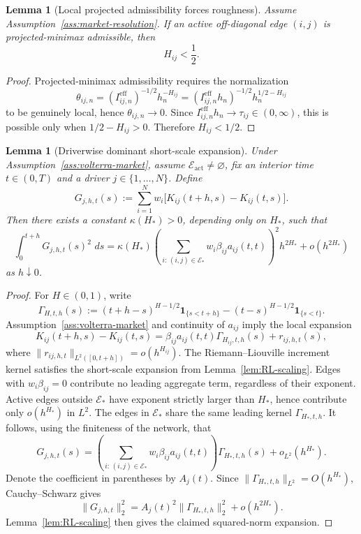 \documentclass[11pt,a4paper]{amsart}
\theoremstyle{plain}
\newtheorem{lemma}[theorem]{Lemma}
\theoremstyle{definition}
\theoremstyle{remark}
\newcommand{\one}{\mathbf{1}}
\newcommand{\dd}{\,d}
\newcommand{\cE}{\mathcal{E}}
\begin{document}
\begin{lemma}[Local projected admissibility forces roughness]\label{lem:admissibility-rough}
Assume Assumption~\ref{ass:market-resolution}.  If an active off-diagonal edge \((i,j)\) is
projected-minimax admissible, then
\[
        H_{ij}<\frac12.
\]
\end{lemma}

\begin{proof}
Projected-minimax admissibility requires the normalization
\[
        \theta_{ij,n}
        =
        (I_{ij,n}^{\mathrm{eff}})^{-1/2}h_n^{-H_{ij}}
        =
        (I_{ij,n}^{\mathrm{eff}} h_n)^{-1/2}h_n^{1/2-H_{ij}}
\]
to be genuinely local, hence \(\theta_{ij,n}\to0\).  Since
\(I_{ij,n}^{\mathrm{eff}}h_n\to\tau_{ij}\in(0,\infty)\), this is
possible only when \(1/2-H_{ij}>0\).  Therefore \(H_{ij}<1/2\).
\end{proof}


\begin{lemma}[Driverwise dominant short-scale expansion]\label{lem:driver-expansion}
Under Assumption~\ref{ass:volterra-market}, assume \(\cE_{\mathrm{act}}\neq\varnothing\), fix an
interior time \(t\in(0,T)\) and a driver \(j\in\{1,\dots,N\}\).  Define
\[
        G_{j,h,t}(s)
        :=
        \sum_{i=1}^N
        w_i\bigl[K_{ij}(t+h,s)-K_{ij}(t,s)\bigr].
\]
Then there exists a constant \(\kappa(H_*)>0\), depending only on \(H_*\), such that
\[
        \int_0^{t+h} G_{j,h,t}(s)^2\,\dd s
        =
        \kappa(H_*)
        \left(
        \sum_{i:\,(i,j)\in\cE_*}
        w_i\beta_{ij}a_{ij}(t,t)
        \right)^2
        h^{2H_*}
        +o(h^{2H_*})
\]
as \(h\downarrow0\).
\end{lemma}

\begin{proof}
For \(H\in(0,1)\), write
\[
        \Gamma_{H,t,h}(s)
        :=
        (t+h-s)^{H-1/2}\one_{\{s<t+h\}}
        -
        (t-s)^{H-1/2}\one_{\{s<t\}}.
\]
Assumption~\ref{ass:volterra-market} and continuity of \(a_{ij}\) imply the local expansion
\[
        K_{ij}(t+h,s)-K_{ij}(t,s)
        =
        \beta_{ij}a_{ij}(t,t)\Gamma_{H_{ij},t,h}(s)
        +
        r_{ij,h,t}(s),
\]
where \(\|r_{ij,h,t}\|_{L^2([0,t+h])}=o(h^{H_{ij}})\).  The Riemann--Liouville increment kernel
satisfies the short-scale expansion from Lemma~\ref{lem:RL-scaling}.  Edges with
\(w_i\beta_{ij}=0\) contribute no leading aggregate term, regardless of their exponent.  Active
edges outside \(\cE_*\) have exponent strictly larger than \(H_*\), hence contribute only
\(o(h^{H_*})\) in \(L^2\).  The edges in \(\cE_*\) share the same leading kernel
\(\Gamma_{H_*,t,h}\).  It follows, using the finiteness of the network, that
\[
        G_{j,h,t}(s)
        =
        \left(
        \sum_{i:\,(i,j)\in\cE_*}
        w_i\beta_{ij}a_{ij}(t,t)
        \right)\Gamma_{H_*,t,h}(s)
        +
        o_{L^2}(h^{H_*}).
\]
Denote the coefficient in parentheses by \(A_j(t)\).  Since
\(\|\Gamma_{H_*,t,h}\|_{L^2}=O(h^{H_*})\), Cauchy--Schwarz gives
\[
        \|G_{j,h,t}\|_2^2
        =
        A_j(t)^2\|\Gamma_{H_*,t,h}\|_2^2
        +
        o(h^{2H_*}).
\]
Lemma~\ref{lem:RL-scaling} then gives the claimed squared-norm expansion.
\end{proof}
\end{document}
